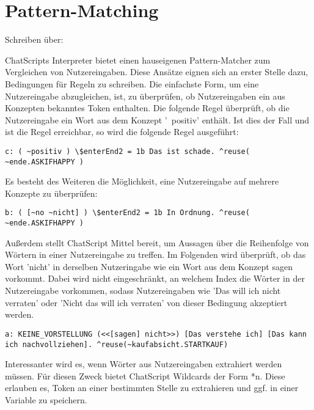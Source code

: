 \section{Pattern-Matching}
\label{sec:ChatScript: Pattern-Matching}

\textcolor[rgb]{1,0.41,0.13}{Schreiben über:}

ChatScripts Interpreter bietet einen hauseigenen Pattern-Matcher zum Vergleichen von Nutzereingaben. Diese Ansätze eignen sich an erster Stelle dazu, Bedingungen für Regeln zu schreiben. Die einfachste Form, um eine Nutzereingabe abzugleichen, ist, zu überprüfen, ob Nutzereingaben ein aus Konzepten bekanntes Token enthalten. Die folgende Regel überprüft, ob die Nutzereingabe ein Wort aus dem Konzept '~positiv' enthält. Ist dies der Fall und ist die Regel erreichbar, so wird die folgende Regel ausgeführt:

\begin{lstlisting}[caption={Regel in kaufabsicht.top}]
c: ( ~positiv ) \$enterEnd2 = 1b Das ist schade. ^reuse( ~ende.ASKIFHAPPY )
\end{lstlisting}

Es besteht des Weiteren die Möglichkeit, eine Nutzereingabe auf mehrere Konzepte zu überprüfen: 

\begin{lstlisting}[caption={Regel in kaufabsicht.top}]
b: ( [~no ~nicht] ) \$enterEnd2 = 1b In Ordnung. ^reuse( ~ende.ASKIFHAPPY )
\end{lstlisting}

Außerdem stellt ChatScript Mittel bereit, um Aussagen über die Reihenfolge von Wörtern in einer Nutzereingabe zu treffen. Im Folgenden wird überprüft, ob das Wort 'nicht' in derselben Nutzeringabe wie ein Wort aus dem Konzept sagen vorkommt. Dabei wird nicht eingeschränkt, an welchem Index die Wörter in der Nutzereingabe vorkommen, sodass Nutzereingaben wie 'Das will ich nicht verraten' oder 'Nicht das will ich verraten' von dieser Bedingung akzeptiert werden. 

\begin{lstlisting}[caption={Regel KEINE\_VORSTELLUNG in introductions.top}]
a: KEINE_VORSTELLUNG (<<[sagen] nicht>>) [Das verstehe ich] [Das kann ich nachvollziehen]. ^reuse(~kaufabsicht.STARTKAUF)
\end{lstlisting}

Interessanter wird es, wenn Wörter aus Nutzereingaben extrahiert werden müssen. Für diesen Zweck bietet ChatScript Wildcards der Form *n. Diese erlauben es, Token an einer bestimmten Stelle zu extrahieren und ggf. in einer Variable zu speichern. 

